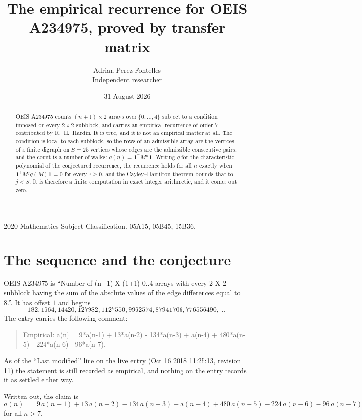\documentclass[11pt,a4paper]{article}
\title{The empirical recurrence for OEIS A234975, proved by transfer matrix}
\author{Adrian Perez Fontelles\\ \small Independent researcher}
\date{31 August 2026}
\theoremstyle{plain}
\theoremstyle{definition}
\begin{document}
\maketitle

\begin{abstract}
OEIS A234975 counts $(n+1)\times2$ arrays over $\{0,\dots,4\}$ subject to a condition imposed on
every $2\times2$ subblock, and carries an empirical recurrence of order $7$ contributed
by R.~H.~Hardin. It is true, and it is not an empirical matter at all. The condition is local
to each subblock, so the rows of an admissible array are the vertices of a finite digraph
on $S=25$ vertices whose edges are the admissible consecutive pairs, and the count is a
number of walks: $a(n)=\mathbf{1}^{\!\top}M^{n}\mathbf{1}$. Writing $q$
for the characteristic polynomial of the conjectured recurrence, the recurrence holds for all
$n$ exactly when $\mathbf{1}^{\!\top}M^{j}q(M)\mathbf{1}=0$ for every $j\ge0$, and the
Cayley--Hamilton theorem bounds that to $j<S$. It is therefore a finite computation in exact
integer arithmetic, and it comes out zero.
\end{abstract}

\noindent\small 2020 Mathematics Subject Classification. 05A15, 05B45, 15B36.\normalsize

\section{The sequence and the conjecture}

OEIS A234975 is ``Number of (n+1) X (1+1) 0..4 arrays with every 2 X 2 subblock having the sum of the absolute values of the edge differences equal to 8.''. It has offset $1$ and begins
\[
182, 1664, 14420, 127982, 1127550, 9962574, 87941706, 776556490,\ \dots
\]
The entry carries the following comment:
\begin{quote}\small
Empirical: a(n) = 9*a(n-1) + 13*a(n-2) - 134*a(n-3) + a(n-4) + 480*a(n-5) - 224*a(n-6) - 96*a(n-7).
\end{quote}
As of the ``Last modified'' line on the live entry (Oct 16 2018 11:25:13, revision 11) the statement is
still recorded as empirical, and nothing on the entry records it as settled either way.

Written out, the claim is
\begin{equation}\label{eq:conj}
a(n)\;=\;9\,a(n-1) + 13\,a(n-2) - 134\,a(n-3) + a(n-4) + 480\,a(n-5) - 224\,a(n-6) - 96\,a(n-7)
\end{equation}
for all $n>7$.
\end{document}

